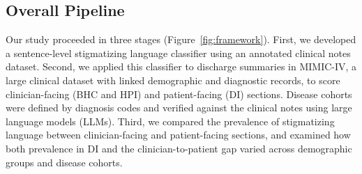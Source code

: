 \documentclass[unnumsec,webpdf,contemporary,large]{oup-authoring-template}
\newcommand{\td}[1]{\sethlcolor{pink}\hl{[Ting: #1]}}
\begin{document}
\subsection{Overall Pipeline}
Our study proceeded in three stages (Figure~\ref{fig:framework}). 
First, we developed %
a sentence-level stigmatizing language classifier using an annotated clinical notes dataset. %
Second, we applied this classifier to discharge summaries in MIMIC-IV, a large clinical dataset with linked demographic and diagnostic records, to score clinician-facing (BHC and HPI) and patient-facing (DI) sections. Disease cohorts were defined by diagnosis codes and verified against the clinical notes using large language models (LLMs).  %
Third, we compared the prevalence of stigmatizing language between clinician-facing and patient-facing sections, and examined how both prevalence in DI and the clinician-to-patient gap varied across demographic groups and disease cohorts.
\end{document}

